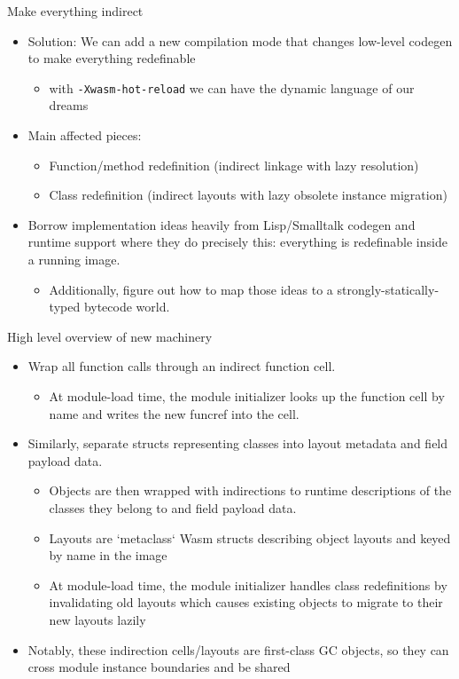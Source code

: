 \documentclass[10pt,presentation]{beamer}
\begin{document}
\begin{frame}[label={sec:org4df60ee},fragile]{Make everything indirect}
 \begin{itemize}
\item Solution: We can add a new compilation mode that changes low-level
codegen to make everything redefinable
\begin{itemize}
\item with \texttt{-Xwasm-hot-reload} we can have the dynamic language of our
dreams
\end{itemize}
\item Main affected pieces:
\begin{itemize}
\item Function/method redefinition (indirect linkage with lazy
resolution)
\item Class redefinition (indirect layouts with lazy obsolete instance
migration)
\end{itemize}
\item Borrow implementation ideas heavily from Lisp/Smalltalk codegen and
runtime support where they do precisely this: everything is
redefinable inside a running image.
\begin{itemize}
\item Additionally, figure out how to map those ideas to a
strongly-statically-typed bytecode world.
\end{itemize}
\end{itemize}
\end{frame}
\begin{frame}[label={sec:orgd55c739}]{High level overview of new machinery}
\begin{itemize}
\item Wrap all function calls through an indirect function \alert{cell}.
\begin{itemize}
\item At module-load time, the module initializer looks up the function
cell by name and writes the new funcref into the cell.
\end{itemize}
\item Similarly, separate structs representing classes into layout
metadata and field payload data.
\begin{itemize}
\item Objects are then wrapped with indirections to runtime descriptions
of the classes they belong to and field payload data.
\item Layouts are `metaclass` Wasm structs describing object layouts and
keyed by name in the image
\item At module-load time, the module initializer handles class
redefinitions by invalidating old layouts which causes existing
objects to migrate to their new layouts lazily
\end{itemize}
\item Notably, these indirection cells/layouts are first-class GC objects,
so they can cross module instance boundaries and be shared
\end{itemize}
\end{frame}
\end{document}
